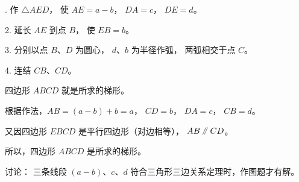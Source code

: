 . 作 $\triangle AED$， 使 $AE = a - b$， $DA = c$， $DE = d$。

2. 延长 $AE$ 到点 $B$， 使 $EB = b$。

3. 分别以点 $B$、$D$ 为圆心， $d$、$b$ 为半径作弧， 两弧相交于点 $C$。

4. 连结 $CB$、$CD$。

四边形 $ABCD$ 就是所求的梯形。

\zhengming 根据作法，$AB = (a - b) + b = a$， $CD = b$， $DA = c$， $CB = d$。

又因四边形 $EBCD$ 是平行四边形（对边相等）， $AB \pingxing CD$。

所以，四边形 $ABCD$ 是所求的梯形。


讨论： 三条线段 $(a - b)$、$c$、$d$ 符合三角形三边关系定理时，作图题才有解。


\begin{lianxi}




\end{lianxi}

